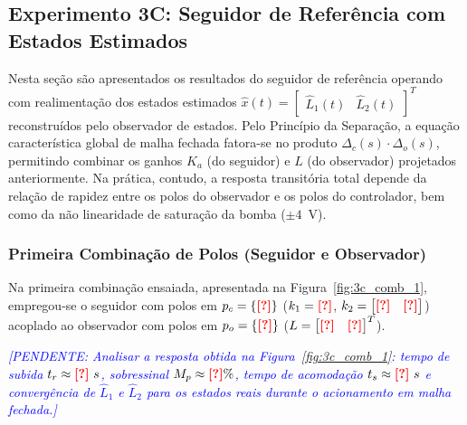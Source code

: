 \documentclass[a4paper,12pt]{article}
\newcommand{\dado}[1]{\textcolor{red}{\textbf{[#1]}}}
\newcommand{\pendente}[1]{\textcolor{blue}{\textit{[PENDENTE: #1]}}}
\newcommand{\dado}[1]{#1}
\newcommand{\pendente}[1]{}
\begin{document}
\newpage

\subsection{Experimento 3C: Seguidor de Referência com Estados Estimados}

\begin{justify}
    \hspace{4ex}Nesta seção são apresentados os resultados do seguidor de referência operando com realimentação dos estados estimados $\hat{x}(t) = \begin{bmatrix} \hat{L}_1(t) & \hat{L}_2(t) \end{bmatrix}^T$ reconstruídos pelo observador de estados. Pelo Princípio da Separação, a equação característica global de malha fechada fatora-se no produto $\Delta_c(s)\cdot\Delta_o(s)$, permitindo combinar os ganhos $K_a$ (do seguidor) e $L$ (do observador) projetados anteriormente. Na prática, contudo, a resposta transitória total depende da relação de rapidez entre os polos do observador e os polos do controlador, bem como da não linearidade de saturação da bomba ($\pm 4$~V).
\end{justify}

\subsubsection{Primeira Combinação de Polos (Seguidor e Observador)}

\begin{justify}
    \hspace{4ex}Na primeira combinação ensaiada, apresentada na Figura~\ref{fig:3c_comb_1}, empregou-se o seguidor com polos em $p_{c} = \{\dado{?}\}$ ($k_1 = \dado{?}$, $k_2 = \begin{bmatrix} \dado{?} & \dado{?} \end{bmatrix}$) acoplado ao observador com polos em $p_{o} = \{\dado{?}\}$ ($L = \begin{bmatrix} \dado{?} & \dado{?} \end{bmatrix}^T$).
\end{justify}

\begin{justify}
    \hspace{4ex}\pendente{Analisar a resposta obtida na Figura~\ref{fig:3c_comb_1}: tempo de subida $t_r \approx \dado{?}~s$, sobressinal $M_p \approx \dado{?}\%$, tempo de acomodação $t_s \approx \dado{?}~s$ e convergência de $\hat{L}_1$ e $\hat{L}_2$ para os estados reais durante o acionamento em malha fechada.}
\end{justify}
\end{document}
